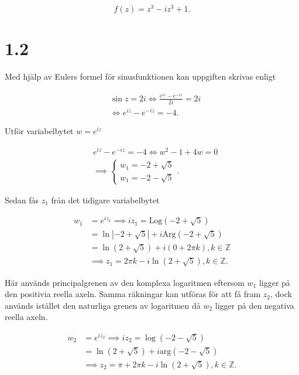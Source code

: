 \documentclass[a4paper]{article}
\begin{document}
\begin{equation*}
	f(z) = z^3 - iz^3 + 1.
\end{equation*}

\section*{1.2}

Med hjälp av Eulers formel för sinusfunktionen kan uppgiften skrivas enligt

\begin{align*}
	&\sin z	= 2i \iff \frac{e^{iz} - e^{-iz}}{2i} = 2i\\
	&\iff e^{iz} - e^{-iz} = -4.
\end{align*}

Utför variabelbytet $w = e^{iz}$

\begin{align*}
	&e^{iz} - e^{-iz} = -4 \iff w^2 - 1 + 4w = 0\\
	&\implies	\begin{cases}
					w_1 = -2 + \sqrt{5}\\
					w_1 = -2 - \sqrt{5}
				\end{cases}.
\end{align*}

Sedan fås $z_1$ från det tidigare variabelbytet

\begin{align*}
	w_1 &= e^{iz_1} \implies iz_1 = \text{Log}(-2 + \sqrt{5})\\
		&= \ln|-2 + \sqrt{5}| + i\text{Arg}(-2 + \sqrt{5})\\
		&= \ln(2+\sqrt{5}) + i(0 + 2\pi k), k \in \mathbb{Z}\\
	 &\implies z_1 = 2\pi k - i\ln(2+\sqrt{5}), k \in \mathbb{Z}.
\end{align*}

Här används principalgrenen av den komplexa logaritmen eftersom $w_1$ ligger på den positivia reella axeln. Samma räkningar kan utföras för att få fram $z_2$, dock används istället den naturliga grenen av logaritmen då $w_2$ ligger på den negativa reella axeln.

\begin{align*}
	w_2 &= e^{iz_2} \implies iz_2 = \log(-2 - \sqrt{5})\\
		&= \ln(2+\sqrt{5}) + i\text{arg}(-2 - \sqrt{5})\\
	 &\implies z_2 = \pi + 2\pi k - i\ln(2 + \sqrt{5}), k \in \mathbb{Z}.
\end{align*}
\end{document}
